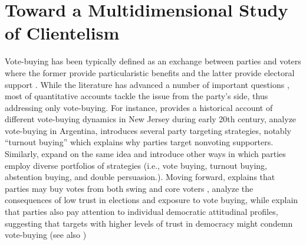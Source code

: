 \documentclass[onesided]{article}\usepackage[]{graphicx}\usepackage[]{color}
\begin{document}












\clearpage
\newpage
{}
\setcounter{page}{1}



\section{Toward a Multidimensional Study of Clientelism}

Vote-buying has been typically defined as an exchange between parties and voters where the former provide particularistic benefits and the latter provide electoral support \parencite{Nichter2008,Nichter2014}. While the literature has advanced a number of important questions \parencite{Hicken2011}, most of quantitative accounts tackle the issue from the party's side, thus addressing only vote-buying. For instance, \textcite{Reynolds1980} provides a historical account of different vote-buying dynamics in New Jersey during early 20th century, \textcite{Brusco2004} analyze vote-buying in Argentina, \textcite{Nichter2008} introduces several party targeting strategies, notably ``turnout buying'' which explains why parties target nonvoting supporters. Similarly, \textcite{Gans-Morse2013} expand on the same idea and introduce other ways in which parties employ diverse portfolios of strategies (i.e., vote buying, turnout buying, abstention buying, and double persuasion.). Moving forward, \textcite{Albertus2012a} explains that parties may buy votes from both swing and core voters , \textcite{Carreras2013a} analyze the consequences of low trust in elections and exposure to vote buying, while \textcite{Carlin2015} explain that parties also pay attention to individual democratic attitudinal profiles, suggesting that targets with higher levels of trust in democracy might condemn vote-buying (see also \cite{Weitz-shapiro})
\end{document}
